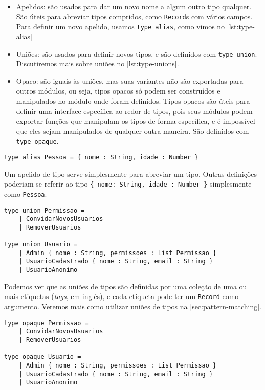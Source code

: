 \begin{itemize}
    \item Apelidos: são usados para dar um novo nome a algum outro tipo qualquer.
          São úteis para abreviar tipos compridos, como \texttt{Record}s com vários
          campos. Para definir um novo apelido, usamos \texttt{type alias}, como
          vimos no \autoref{lst:type-alias}
    \item Uniões: são usados para definir novos tipos, e são definidos com \texttt{type union}.
          Discutiremos mais sobre uniões no \autoref{lst:type-unions}.
    \item Opaco: são iguais às uniões, mas suas variantes não são exportadas para
          outros módulos, ou seja, tipos opacos só podem ser construídos e manipulados
          no módulo onde foram definidos. Tipos opacos são úteis para definir uma interface
          específica ao redor de tipos, pois seus módulos podem exportar funções
          que manipulam os tipos de forma específica, e é impossível que eles sejam manipulados
          de qualquer outra maneira. São definidos com \texttt{type opaque}.
\end{itemize}


\begin{lstlisting}[label={lst:type-alias},caption={Exemplo de apelido de tipo}]
type alias Pessoa = { nome : String, idade : Number }
\end{lstlisting}

Um apelido de tipo serve simplesmente para abreviar um tipo. Outras definições
poderiam se referir ao tipo \texttt{\{ nome: String, idade : Number \}} simplesmente
como \texttt{Pessoa}.

\begin{lstlisting}[label={lst:type-unions},caption={Exemplo de união de tipos}]
type union Permissao =
    | ConvidarNovosUsuarios
    | RemoverUsuarios

type union Usuario =
    | Admin { nome : String, permissoes : List Permissao }
    | UsuarioCadastrado { nome : String, email : String }
    | UsuarioAnonimo
\end{lstlisting}

Podemos ver que as uniões de tipos são definidas por uma coleção de uma ou mais
etiquetas (\textit{tags}, em inglês), e cada etiqueta pode ter um \texttt{Record}
como argumento. Veremos mais como utilizar uniões de tipos na \autoref{sec:pattern-matching}.

\begin{lstlisting}[label={lst:type-opaque},caption={Exemplo de tipos opacos}]
type opaque Permissao =
    | ConvidarNovosUsuarios
    | RemoverUsuarios

type opaque Usuario =
    | Admin { nome : String, permissoes : List Permissao }
    | UsuarioCadastrado { nome : String, email : String }
    | UsuarioAnonimo
\end{lstlisting}

